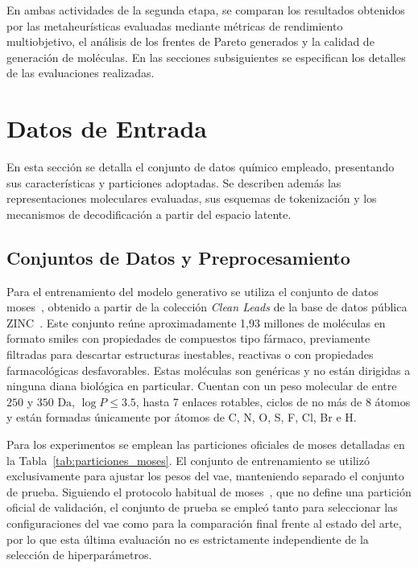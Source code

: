 En ambas actividades de la segunda etapa, se comparan los resultados obtenidos por las metaheurísticas evaluadas mediante métricas de rendimiento multiobjetivo, el análisis de los frentes de Pareto generados y la calidad de generación de moléculas. En las secciones subsiguientes se especifican los detalles de las evaluaciones realizadas.

\section{Datos de Entrada}
\label{sec:datos_entrada}

En esta sección se detalla el conjunto de datos químico empleado, presentando sus características y particiones adoptadas. Se describen además las representaciones moleculares evaluadas, sus esquemas de tokenización y los mecanismos de decodificación a partir del espacio latente.

\subsection{Conjuntos de Datos y Preprocesamiento}
\label{subsec:datasets}

Para el entrenamiento del modelo generativo se utiliza el conjunto de datos \gls{moses}~\cite{polykovskiy2020molecular}, obtenido a partir de la colección \textit{Clean Leads} de la base de datos pública ZINC~\cite{irwin2020zinc20}. Este conjunto reúne aproximadamente 1,93 millones de moléculas en formato \gls{smiles} con propiedades de compuestos tipo fármaco, previamente filtradas para descartar estructuras inestables, reactivas o con propiedades farmacológicas desfavorables. Estas moléculas son genéricas y no están dirigidas a ninguna diana biológica en particular. Cuentan con un peso molecular de entre $250$ y $350\text{ Da}$, $\log P \le 3.5$, hasta 7 enlaces rotables, ciclos de no más de 8 átomos y están formadas únicamente por átomos de C, N, O, S, F, Cl, Br e H.

Para los experimentos se emplean las particiones oficiales de \gls{moses} detalladas en la Tabla~\ref{tab:particiones_moses}. El conjunto de entrenamiento se utilizó exclusivamente para ajustar los pesos del \gls{vae}, manteniendo separado el conjunto de prueba. Siguiendo el protocolo habitual de \gls{moses}~\cite{polykovskiy2020molecular}, que no define una partición oficial de validación, el conjunto de prueba se empleó tanto para seleccionar las configuraciones del \gls{vae} como para la comparación final frente al estado del arte, por lo que esta última evaluación no es estrictamente independiente de la selección de hiperparámetros.

